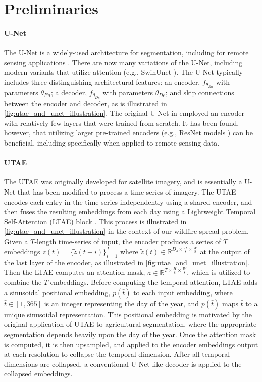 \section{Preliminaries}
\label{sec:preliminaries}

\paragraph{U-Net \cite{ronneberger2015u}} The U-Net is a widely-used architecture for segmentation, including for remote sensing applications \cite{li2024review}.  There are now many variations of the U-Net, including modern variants that utilize attention (e.g., SwinUnet \cite{cao2022swin}).  The U-Net typically includes three distinguishing architectural features: an encoder, $f_{\theta_{En}}$ with parameters $\theta_{En}$; a decoder, $f_{\theta_{De}}$ with parameters $\theta_{De}$; and skip connections between the encoder and decoder, as is illustrated in \cref{fig:utae_and_unet_illustration}.  The original U-Net in \cite{ronneberger2015u} employed an encoder with relatively few layers that were trained from scratch.  It has been found, however, that utilizing larger pre-trained encoders (e.g., ResNet models \cite{he2016deep}) can be beneficial, including specifically when applied to remote sensing data\cite{iglovikov2018ternausnet}.     

\paragraph{UTAE \cite{garnot2021panoptic}} The UTAE was originally developed for satellite imagery, and is essentially a U-Net that has been modified to process a time-series of imagery.  The UTAE encodes each entry in the time-series independently using a shared encoder, and then fuses the resulting embeddings from each day using a Lightweight Temporal Self-Attention (LTAE) block \cite{garnot2020lightweight}. This process is illustrated in \cref{fig:utae_and_unet_illustration} in the context of our wildfire spread problem.  Given a $T$-length time-series of input, the encoder produces a series of $T$ embeddings $z(t)= \{ \tilde{z}(t-i) \}_{i=1}^{T}$ where $\tilde{z}(t) \in \mathbb{R}^{D_{4} \times \frac{H}{8} \times \frac{W}{8}}$ at the output of the last layer of the encoder, as illustrated in \cref{fig:utae_and_unet_illustration}.  Then the LTAE computes an attention mask, $a \in \mathbb{R}^{T \times \frac{H}{8} \times \frac{W}{8}}$, which is utilized to combine the $T$ embeddings. Before computing the temporal attention, LTAE adds a sinusoidal positional embedding, $p(\bar{t})$ to each input embedding, where $\bar{t} \in [1,365]$ is an integer representing the day of the year, and $p(\bar{t})$ maps $\bar{t}$ to a unique sinusoidal representation.  This positional embedding is motivated by the original application of UTAE to agricultural segmentation, where the appropriate segmentation depends heavily upon the day of the year.  Once the attention mask is computed, it is then upsampled, and applied to the encoder embeddings output at each resolution to collapse the temporal dimension. After all temporal dimensions are collapsed, a conventional U-Net-like decoder is applied to the collapsed embeddings.  


